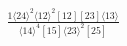 \documentclass[varwidth, border=5pt]{standalone}
\begin{document}
\begin{my}
$\begin{gathered}
\scriptscriptstyle\frac{1⟨24⟩^2⟨12⟩^2[12][23]⟨13⟩}{⟨14⟩^4[15]⟨23⟩^2[25]}
\end{gathered}$
\end{my}
\end{document}
